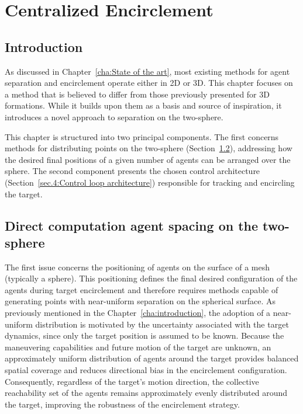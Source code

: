 
%

\chapter{Centralized Encirclement}
\label{cha:Centralized Development}

\glsresetall

\section{Introduction} \label{sec.4:Introduction}
As discussed in Chapter~\ref{cha:State of the art}, most existing methods for agent separation and encirclement operate either in \gls{2D} or \gls{3D}. This chapter focuses on a method that is believed to differ from those previously presented for \gls{3D} formations. While it builds upon them as a basis and source of inspiration, it introduces a novel approach to separation on the two-sphere.

This chapter is structured into two principal components. The first concerns methods for distributing points on the two-sphere (Section~\ref{sec.4:Direct computation agent spacing on the two-sphere}), addressing how the desired final positions of a given number of agents can be arranged over the sphere. The second component presents the chosen control architecture (Section~\ref{sec.4:Control loop architecture}) responsible for tracking and encircling the target.

\section{Direct computation agent spacing on the two-sphere} \label{sec.4:Direct computation agent spacing on the two-sphere}

The first issue concerns the positioning of agents on the surface of a mesh (typically a sphere). This positioning defines the final desired configuration of the agents during target encirclement and therefore requires methods capable of generating points with near-uniform separation on the spherical surface. As previously mentioned in the Chapter~\ref{cha:introduction}, the adoption of a near-uniform distribution is motivated by the uncertainty associated with the target dynamics, since only the target position is assumed to be known. Because the maneuvering capabilities and future motion of the target are unknown, an approximately uniform distribution of agents around the target provides balanced spatial coverage and reduces directional bias in the encirclement configuration. Consequently, regardless of the target's motion direction, the collective reachability set of the agents remains approximately evenly distributed around the target, improving the robustness of the encirclement strategy.

